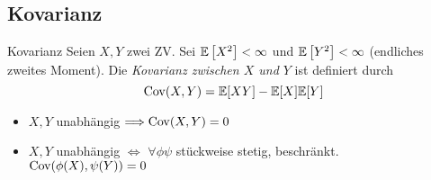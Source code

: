 \subsection{Kovarianz}%
\label{sub:kovarianz}

\begin{definition}{Kovarianz} 
	Seien $X,Y$ zwei ZV. Sei $\mathbb{E} \left[ X^2 \right] < \infty$ und $\mathbb{E} \left[ Y^2 \right] < \infty$ (endliches zweites
	Moment). Die \emph{Kovarianz zwischen $X$ und $Y$} ist definiert durch
	\begin{equation*}
		\operatorname{Cov} (X,Y) = \mathbb{E} [XY] - \mathbb{E} [X] \mathbb{E}[Y]
	\end{equation*}
	\begin{itemize}
		\item $X,Y$ unabhängig $ \Longrightarrow \operatorname{Cov} (X,Y) = 0$
	\item $X,Y$ unabhängig $ \Longleftrightarrow$ $\forall \phi \psi$ stückweise stetig, beschränkt. $\operatorname{Cov} (\phi(X),
			\psi (Y)) = 0$
	\end{itemize}
\end{definition}
